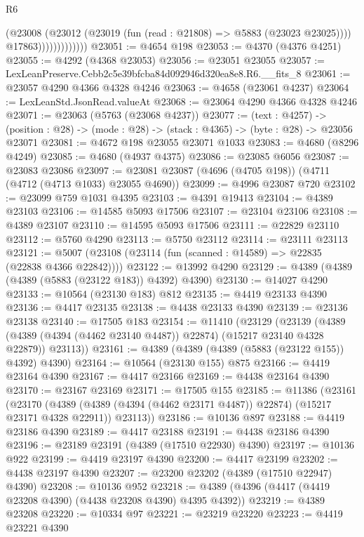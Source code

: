 \begin{lexlean}{R6}
\begin{coremodule}
                            (@23008
                              (@23012 (@23019 (fun (read : @21808) => @5883 (@23023 @23025))))
                              @17863)))))))))))))
@23051 := @4654 @198
@23053 := @4370 (@4376 @4251)
@23055 := @4292 (@4368 @23053)
@23056 := @23051 @23055
@23057 := LexLeanPreserve.Cebb2c5e39bfcba84d092946d320ea8e8.R6.__fits_8
@23061 := @23057 @4290 @4366 @4328 @4246
@23063 := @4658 (@23061 @4237)
@23064 := LexLeanStd.JsonRead.valueAt
@23068 := @23064 @4290 @4366 @4328 @4246
@23071 := @23063 (@5763 (@23068 @4237))
@23077 := (text : @4257) ->
  (position : @28) -> (mode : @28) -> (stack : @4365) -> (byte : @28) -> @23056 @23071
@23081 := @4672 @198 @23055 @23071 @1033
@23083 := @4680 (@8296 @4249)
@23085 := @4680 (@4937 @4375)
@23086 := @23085 @6056
@23087 := @23083 @23086
@23097 := @23081 @23087 (@4696 (@4705 @198)) (@4711 (@4712 (@4713 @1033) @23055 @4690))
@23099 := @4996 @23087 @720
@23102 := @23099 @759 @1031 @4395
@23103 := @4391 @19413
@23104 := @4389 @23103
@23106 := @14585 @5093 @17506
@23107 := @23104 @23106
@23108 := @4389 @23107
@23110 := @14595 @5093 @17506
@23111 := @22829 @23110
@23112 := @5760 @4290
@23113 := @5750 @23112
@23114 := @23111 @23113
@23121 := @5007 (@23108 (@23114 (fun (scanned : @14589) => @22835 (@22838 @4366 @22842))))
@23122 := @13992 @4290
@23129 := @4389 (@4389 (@4389 (@5883 (@23122 @183)) @4392) @4390)
@23130 := @14027 @4290
@23133 := @10564 (@23130 @183) @812
@23135 := @4419 @23133 @4390
@23136 := @4417 @23135
@23138 := @4438 @23133 @4390
@23139 := @23136 @23138
@23140 := @17505 @183
@23154 := @11410
    (@23129
      (@23139
        (@4389 (@4389 (@4394 (@4462 @23140 @4487)) @22874) (@15217 @23140 @4328 @22879))
        @23113))
@23161 := @4389 (@4389 (@4389 (@5883 (@23122 @155)) @4392) @4390)
@23164 := @10564 (@23130 @155) @875
@23166 := @4419 @23164 @4390
@23167 := @4417 @23166
@23169 := @4438 @23164 @4390
@23170 := @23167 @23169
@23171 := @17505 @155
@23185 := @11386
    (@23161
      (@23170
        (@4389 (@4389 (@4394 (@4462 @23171 @4487)) @22874) (@15217 @23171 @4328 @22911))
        @23113))
@23186 := @10136 @897
@23188 := @4419 @23186 @4390
@23189 := @4417 @23188
@23191 := @4438 @23186 @4390
@23196 := @23189 @23191 (@4389 (@17510 @22930) @4390)
@23197 := @10136 @922
@23199 := @4419 @23197 @4390
@23200 := @4417 @23199
@23202 := @4438 @23197 @4390
@23207 := @23200 @23202 (@4389 (@17510 @22947) @4390)
@23208 := @10136 @952
@23218 := @4389 (@4396 (@4417 (@4419 @23208 @4390) (@4438 @23208 @4390) @4395 @4392))
@23219 := @4389 @23208
@23220 := @10334 @97
@23221 := @23219 @23220
@23223 := @4419 @23221 @4390

\end{coremodule}
\end{lexlean}

